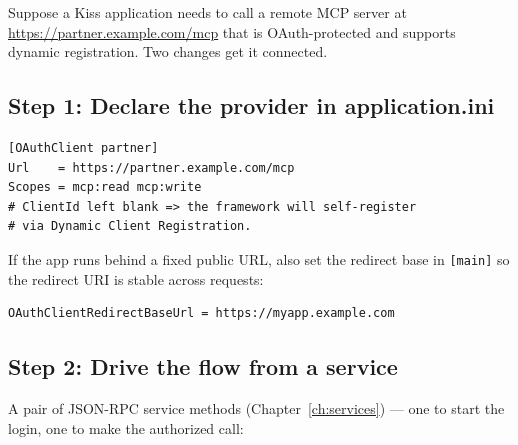 Suppose a Kiss application needs to call a remote MCP server at \url{https://partner.example.com/mcp} that is OAuth-protected and supports dynamic registration.  Two changes get it connected.

\subsection{Step 1: Declare the provider in application.ini}

\begin{lstlisting}[style=ini]
[OAuthClient partner]
Url    = https://partner.example.com/mcp
Scopes = mcp:read mcp:write
# ClientId left blank => the framework will self-register
# via Dynamic Client Registration.
\end{lstlisting}

\noindent
If the app runs behind a fixed public URL, also set the redirect base in \texttt{[main]} so the redirect URI is stable across requests:

\begin{lstlisting}[style=ini]
OAuthClientRedirectBaseUrl = https://myapp.example.com
\end{lstlisting}

\subsection{Step 2: Drive the flow from a service}

A pair of JSON-RPC service methods (Chapter~\ref{ch:services}) --- one to start the login, one to make the authorized call:

